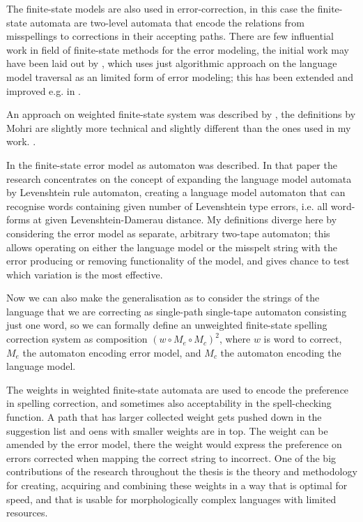 \documentclass[officiallayout]{unihelcompling}
\begin{document}
The finite-state models are also used in error-correction, in this case the
finite-state automata are two-level automata that encode the relations from
misspellings to corrections in their accepting paths. There are few influential
work in field of finite-state methods for the error modeling, the initial work
may have been laid out by \citep{oflazer1996errortolerant}, which uses just
algorithmic approach on the language model traversal as an limited form of
error modeling; this has been extended and improved e.g. in
\citep{hulden2009fast}. 

An approach on weighted finite-state system was
described by \citep{mohri2003edit}, the definitions by Mohri are slightly more
technical and slightly different than the ones used in my work. .

In \citep{agata2002typographical} the
finite-state error model as automaton was described. In that paper the research
concentrates on the concept of expanding the language model automata by
Levenshtein rule automaton, creating a language model automaton that can
recognise words containing given number of Levenshtein type errors, i.e. all
word-forms at given Levenshtein-Damerau distance. My definitions diverge here
by considering the error model as separate, arbitrary two-tape automaton; this
allows operating on either the language model or the misspelt string with the
error producing or removing functionality of the model, and gives chance to
test which variation is the most effective. 

Now we can also make the generalisation as to consider the strings of the
language that we are correcting as single-path single-tape automaton consisting
just one word, so we can formally define an unweighted finite-state spelling
correction system as composition $(w \circ M_e \circ M_c)^2$, where $w$ is word
to correct, $M_e$ the automaton encoding error model, and $M_c$ the automaton
encoding the language model. 

The weights in weighted finite-state automata are used to encode the preference
in spelling correction, and sometimes also acceptability in the spell-checking
function. A path that has larger collected weight gets pushed down in the
suggestion list and oens with smaller weights are in top. The weight can be
amended by the error model, there the weight would express the preference on
errors corrected when mapping the correct string to incorrect. One of the big
contributions of the research throughout the thesis is the theory and
methodology for creating, acquiring and combining these weights in a way that
is optimal for speed, and that is usable for morphologically complex languages
with limited resources.
\end{document}
